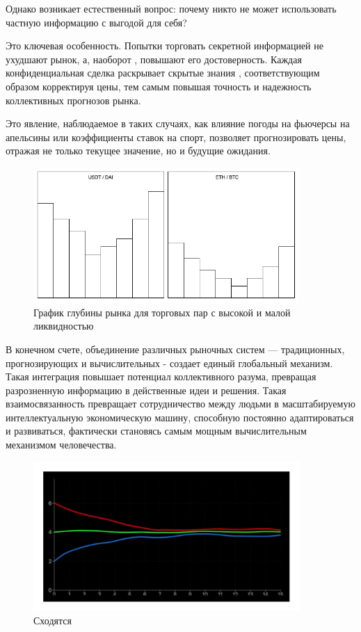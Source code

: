 \documentclass[
    14pt,
    specialist,
    candidate, %
    subf, %
    href,
    dotsinheaders=false
]{disser}
\begin{document}
Однако возникает естественный вопрос: почему никто не может использовать частную информацию с выгодой для себя?

Это ключевая особенность. Попытки торговать секретной информацией не ухудшают рынок, а, наоборот , повышают его достоверность. Каждая конфиденциальная сделка раскрывает скрытые знания , соответствующим образом корректируя цены, тем самым повышая точность и надежность
коллективных прогнозов рынка.

Это явление, наблюдаемое в таких случаях, как влияние погоды на фьючерсы на апельсины или коэффициенты ставок на спорт, позволяет прогнозировать цены, отражая не только текущее значение, но и будущие ожидания.

\begin{figure}[h]
  \centering
  \includegraphics[width=0.9\textwidth]{./assets/limit-order.drawio.png}
  \caption{График глубины рынка для торговых пар с высокой и малой ликвидностью}
  \label{fig:limit-order}
\end{figure}

В конечном счете, объединение различных рыночных систем — традиционных, прогнозирующих и вычислительных - создает единый глобальный механизм. Такая интеграция повышает потенциал
коллективного разума, превращая разрозненную информацию в действенные идеи и решения. Такая взаимосвязанность превращает сотрудничество между людьми в масштабируемую интеллектуальную
экономическую машину, способную постоянно адаптироваться и развиваться, фактически становясь самым мощным вычислительным механизмом человечества.

\begin{figure}[h]
  \centering
  \includegraphics[width=0.9\textwidth]{./assets/one-price.png}
  \caption{Сходятся}
  \label{fig:limit-orders-2}
\end{figure}
\end{document}
